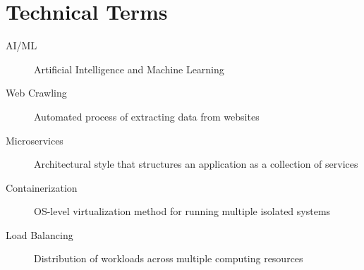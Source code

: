 \documentclass[12pt,a4paper]{report}
\begin{document}
\section{Technical Terms}
\begin{description}
    \item[AI/ML] Artificial Intelligence and Machine Learning
    \item[Web Crawling] Automated process of extracting data from websites
    \item[Microservices] Architectural style that structures an application as a collection of services
    \item[Containerization] OS-level virtualization method for running multiple isolated systems
    \item[Load Balancing] Distribution of workloads across multiple computing resources
\end{description}
\end{document}
